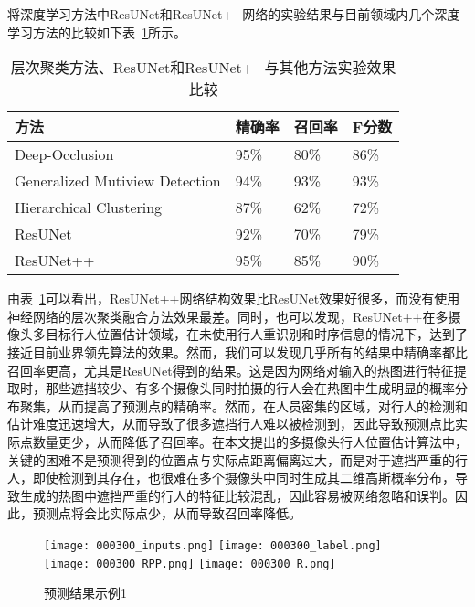 将深度学习方法中ResUNet和ResUNet++网络的实验结果与目前领域内几个深度学习方法的比较如下表~\ref{experiments}所示。
\begin{table}
    \centering
    \caption{层次聚类方法、ResUNet和ResUNet++与其他方法实验效果比较}
    \begin{tabular}{llll}
        \toprule
        方法 & 精确率  & 召回率 & F分数                       \\
        \midrule
        Deep-Occlusion\cite{baque2017deep} & 95\% & 80\% & 86\%                  \\
        Generalized Mutiview Detection\cite{vora2021bringing} & 94\% & 93\% & 93\%  \\
        Hierarchical Clustering & 87\% & 62\% & 72\%         \\
        ResUNet & 92\% & 70\% & 79\%                         \\
        ResUNet++ & 95\% & 85\% & 90\%                      \\
        \bottomrule
    \end{tabular}
    \label{experiments}
\end{table}

由表~\ref{experiments}可以看出，ResUNet++网络结构效果比ResUNet效果好很多，而没有使用神经网络的层次聚类融合方法效果最差。同时，也可以发现，ResUNet++在多摄像头多目标行人位置估计领域，在未使用行人重识别和时序信息的情况下，达到了接近目前业界领先算法的效果。然而，我们可以发现几乎所有的结果中精确率都比召回率更高，尤其是ResUNet得到的结果。这是因为网络对输入的热图进行特征提取时，那些遮挡较少、有多个摄像头同时拍摄的行人会在热图中生成明显的概率分布聚集，从而提高了预测点的精确率。然而，在人员密集的区域，对行人的检测和估计难度迅速增大，从而导致了很多遮挡行人难以被检测到，因此导致预测点比实际点数量更少，从而降低了召回率。在本文提出的多摄像头行人位置估计算法中，关键的困难不是预测得到的位置点与实际点距离偏离过大，而是对于遮挡严重的行人，即使检测到其存在，也很难在多个摄像头中同时生成其二维高斯概率分布，导致生成的热图中遮挡严重的行人的特征比较混乱，因此容易被网络忽略和误判。因此，预测点将会比实际点少，从而导致召回率降低。

\begin{figure}
    \centering
      {\texttt{[image: 000300\_inputs.png]}}
      {\texttt{[image: 000300\_label.png]}}
      {\texttt{[image: 000300\_RPP.png]}}
      {\texttt{[image: 000300\_R.png]}}
    \caption{预测结果示例1}
    \label{success}
\end{figure}

